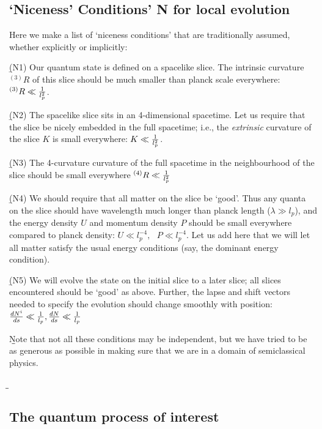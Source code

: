\documentclass[12pt]{article}
\begin{document}
\subsection{`Niceness' Conditions' N for local evolution}\label{n}


Here we make a list of `niceness conditions' that are traditionally assumed, whether explicitly or implicitly:

\b

(N1) Our quantum state is defined on a spacelike slice. The intrinsic curvature ${}^{(3)} R$ of this slice should be much smaller than planck scale everywhere: ${}^{(3)} R\ll {1\over l_p^2}$. 

\b

(N2) The spacelike slice sits in an 4-dimensional spacetime. Let us require that the slice be nicely embedded in the full spacetime; i.e., the {\it extrinsic} curvature of the slice $K$ is small everywhere: $K\ll {1\over l_p^2}$. 

\b

(N3) The 4-curvature curvature of the full spacetime in the neighbourhood of the slice should be small everywhere ${}^{(4)} R\ll {1\over l_p^2}$

\b


(N4) We should require that all matter on the slice be `good'. Thus any quanta  on the slice should have wavelength much longer than planck length ($\lambda\gg l_p$), and the  energy density $U$ and momentum density $P$ should be small everywhere compared to planck density: $U\ll l_p^{-4}, ~~~P\ll l_p^{-4}$. 
Let us add here that we will let all matter satisfy the usual energy conditions (say, the dominant energy condition). 

\b

(N5) We will evolve the state on the initial slice to a later slice; all slices encountered should be `good' as above. Further, the lapse and shift vectors needed to specify the evolution should change smoothly with position: $
{dN^i\over ds}\ll {1\over l_p}, {dN\over ds}\ll {1\over l_p} $

\b

\b

Note that not all these conditions may be   independent, but we have tried to be as generous as possible in making sure that we are in a domain of semiclassical physics. 

\b

\b

\subsection{The quantum process of interest}
\end{document}
